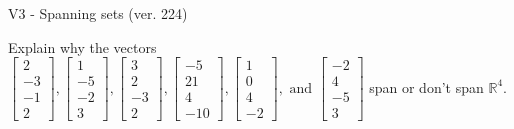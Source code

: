 \begin{exercise}
  \begin{exerciseTitle}V3 - Spanning sets (ver. 224)\end{exerciseTitle}
  \begin{exerciseStatement}
    Explain why the vectors \(\left[\begin{array}{r}
2 \\
-3 \\
-1 \\
2
\end{array}\right] , \left[\begin{array}{r}
1 \\
-5 \\
-2 \\
3
\end{array}\right] , \left[\begin{array}{r}
3 \\
2 \\
-3 \\
2
\end{array}\right] , \left[\begin{array}{r}
-5 \\
21 \\
4 \\
-10
\end{array}\right] , \left[\begin{array}{r}
1 \\
0 \\
4 \\
-2
\end{array}\right] , \text{ and } \left[\begin{array}{r}
-2 \\
4 \\
-5 \\
3
\end{array}\right]\) span or don't span \(\mathbb{R}^4\). 
	



\end{exerciseStatement}
\end{exercise}

